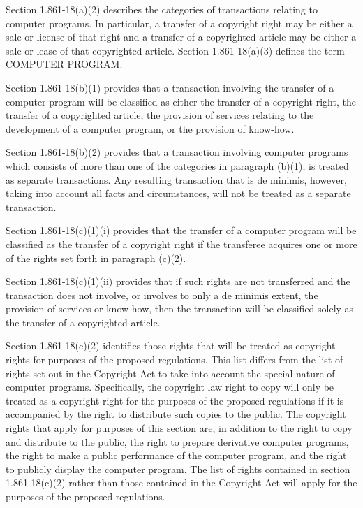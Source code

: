 \begin{select}
Section 1.861-18(a)(2) describes the categories of transactions relating to computer programs. In particular, a transfer of a copyright right may be either a sale or license of that right and a transfer of a copyrighted article may be either a sale or lease of that copyrighted article. Section 1.861-18(a)(3) defines the term COMPUTER PROGRAM.

Section 1.861-18(b)(1) provides that a transaction involving the transfer of a computer program will be classified as either the transfer of a copyright right, the transfer of a copyrighted article, the provision of services relating to the development of a computer program, or the provision of know-how.

Section 1.861-18(b)(2) provides that a transaction involving computer programs which consists of more than one of the categories in paragraph (b)(1), is treated as separate transactions. Any resulting transaction that is de minimis, however, taking into account all facts and circumstances, will not be treated as a separate transaction.

Section 1.861-18(c)(1)(i) provides that the transfer of a computer program will be classified as the transfer of a copyright right if the transferee acquires one or more of the rights set forth in paragraph (c)(2).


Section 1.861-18(c)(1)(ii) provides that if such rights are not transferred and the transaction does not involve, or involves to only a de minimis extent, the provision of services or know-how, then the transaction will be classified solely as the transfer of a copyrighted article.

Section 1.861-18(c)(2) identifies those rights that will be treated as copyright rights for purposes of the proposed regulations. This list differs from the list of rights set out in the Copyright Act to take into account the special nature of computer programs. Specifically, the copyright law right to copy will only be treated as a copyright right for the purposes of the proposed regulations if it is accompanied by the right to distribute such copies to the public. The copyright rights that apply for purposes of this section are, in addition to the right to copy and distribute to the public, the right to prepare derivative computer programs, the right to make a public performance of the computer program, and the right to publicly display the computer program. The list of rights contained in section 1.861-18(c)(2) rather than those contained in the Copyright Act will apply for the purposes of the proposed regulations.


\end{select}
